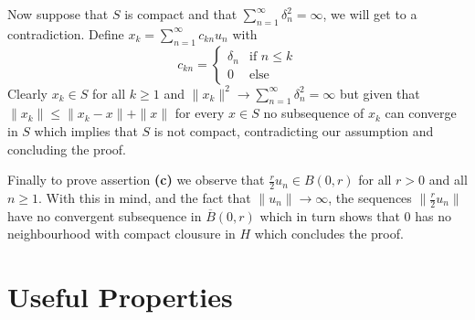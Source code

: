 \documentclass{article}
\begin{document}
\begin{exercise}
\bigbreak

Now suppose that $S$ is compact and that $\sum_{n=1}^{\infty} \delta_n^2 = \infty $, we will get to a contradiction. Define $x_k = \sum_{n=1}^{\infty} c_{kn}u_n $ with
\[
    c_{kn} = 
    \begin{cases}
        \delta_n & \text{if } n \le k \\
        0 & \text{else}
    \end{cases}
\]
Clearly $x_k \in S$ for all $k \ge 1$  and $\|x_k\|^2 \rightarrow \sum_{n=1}^{\infty} \delta_n^2 = \infty$ but given that $\|x_k\| \le \|x_k-x\| + \|x\|$ for every $x \in S$ no subsequence of $x_k$ can converge in $S$ which implies that $S$ is not compact, contradicting our assumption and concluding the proof.  

\bigbreak

Finally to prove assertion \textbf{(c)} we observe that $\frac{r}{2}u_n \in B \left( 0,r \right)$ for all $r > 0$ and all $n \ge 1$. With this in mind, and the fact that $\|u_n\| \rightarrow \infty $, the sequences $\|\frac{r}{2}u_n\| $ have no convergent subsequence in $\overline{B} \left( 0,r \right) $ which in turn shows that $0$ has no neighbourhood with compact clousure in $H$ which concludes the proof. 
\end{exercise}

\section*{Useful Properties}
\end{document}

